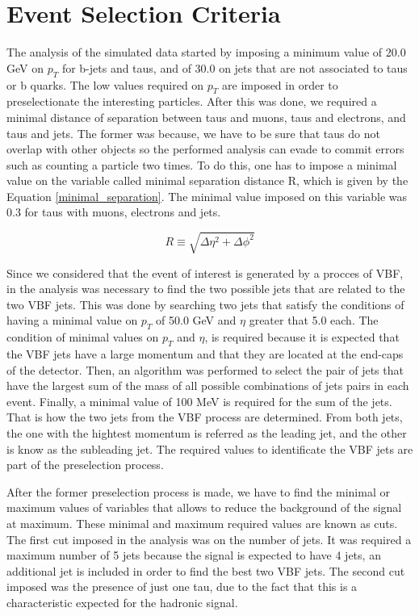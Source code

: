 \chapter{Event Selection Criteria}
\label{Event_selection_criteria_chapter}

The analysis of the simulated data started by imposing a minimum value of 20.0 GeV on $p_T$ for b-jets and taus, and of 30.0 on jets that are not associated to taus or b quarks. The low values required on $p_T$ are imposed in order to preselectionate the interesting particles. After this was done, we required a minimal distance of separation between taus and muons, taus and electrons, and taus and jets. The former was because, we have to be sure that taus do not overlap with other objects so the performed analysis can evade to commit errors such as counting a particle two times. To do this, one has to impose a minimal value on the variable called minimal separation distance R, which is given by the Equation \ref{minimal_separation}. The minimal value imposed on this variable was 0.3 for taus with muons, electrons and jets. 

\begin{equation}
R \equiv \sqrt{\Delta \eta ^2 + \Delta \phi ^2}
\label{minimal_separation}
\end{equation}

Since we considered that the event of interest is generated by a procces of VBF, in the analysis was necessary to find the two possible jets that are related to the two VBF jets. This was done by searching two jets that satisfy the conditions of having a minimal value on $p_T$ of 50.0 GeV and $\eta$ greater that 5.0 each. The condition of minimal values on $p_T$ and $\eta$, is required because it is expected that the VBF jets have a large momentum and that they are located at the end-caps of the detector. Then, an algorithm was performed to select the pair of jets that have the largest sum of the mass of all possible combinations of jets pairs in each event. Finally, a minimal value of 100 MeV is required for the sum of the jets. That is how the two jets from the VBF process are determined. From both jets, the one with the hightest momentum is referred as the leading jet, and the other is know as the subleading jet. The required values to identificate the VBF jets are part of the preselection process.

After the former preselection process is made, we have to find the minimal or maximum values of variables that allows to reduce the background of the signal at maximum. These minimal and maximum required values are known as cuts. The first cut imposed in the analysis was on the number of jets. It was required a maximum number of 5 jets because the signal is expected to have 4 jets, an additional jet is included in order to find the best two VBF jets. The second cut imposed was the presence of just one tau, due to the fact that this is a characteristic expected for the hadronic signal. 

